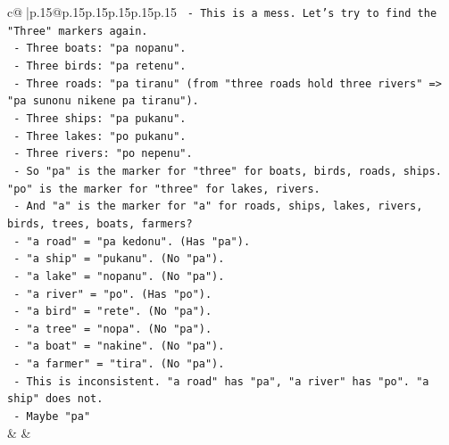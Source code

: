 \documentclass{article}
\begin{document}
{\begin{supertabular}{c@{$\;$}|p{.15\linewidth}@{}p{.15\linewidth}p{.15\linewidth}p{.15\linewidth}p{.15\linewidth}p{.15\linewidth}}
{{{\texttt{                             {-} This is a mess. Let's try to find the "Three" markers again.} \\
\texttt{                               {-} Three boats: "pa nopanu".} \\
\texttt{                               {-} Three birds: "pa retenu".} \\
\texttt{                               {-} Three roads: "pa tiranu" (from "three roads hold three rivers" => "pa sunonu nikene pa tiranu").} \\
\texttt{                               {-} Three ships: "pa pukanu".} \\
\texttt{                               {-} Three lakes: "po pukanu".} \\
\texttt{                               {-} Three rivers: "po nepenu".} \\
\texttt{                             {-} So "pa" is the marker for "three" for boats, birds, roads, ships. "po" is the marker for "three" for lakes, rivers.} \\
\texttt{                             {-} And "a" is the marker for "a" for roads, ships, lakes, rivers, birds, trees, boats, farmers?} \\
\texttt{                               {-} "a road" = "pa kedonu". (Has "pa").} \\
\texttt{                               {-} "a ship" = "pukanu". (No "pa").} \\
\texttt{                               {-} "a lake" = "nopanu". (No "pa").} \\
\texttt{                               {-} "a river" = "po". (Has "po").} \\
\texttt{                               {-} "a bird" = "rete". (No "pa").} \\
\texttt{                               {-} "a tree" = "nopa". (No "pa").} \\
\texttt{                               {-} "a boat" = "nakine". (No "pa").} \\
\texttt{                               {-} "a farmer" = "tira". (No "pa").} \\
\texttt{                             {-} This is inconsistent. "a road" has "pa", "a river" has "po". "a ship" does not.} \\
\texttt{                             {-} Maybe "pa"} \\
            }
        }
    }
    & & \\ \\


\end{supertabular}}
\end{document}
